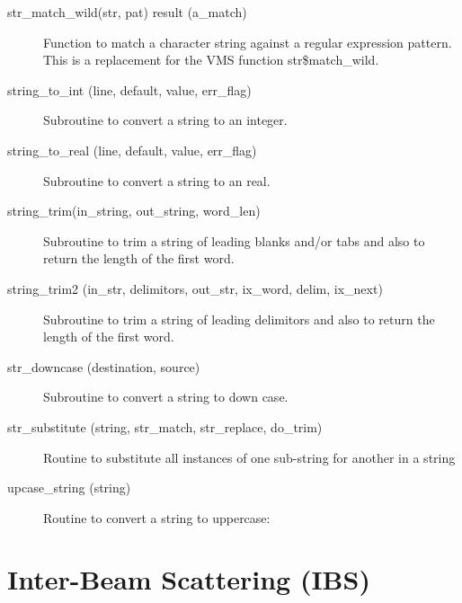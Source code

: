 \begin{description}
\label{r:str.match.wild}
\item[str_match_wild(str, pat) result (a_match)] \Newline 
Function to match a character string against a regular expression pattern.
This is a replacement for the VMS function str\$match_wild.

\label{r:string.to.int}
\item[string_to_int (line, default, value, err_flag)] \Newline 
Subroutine to convert a string to an integer.


\label{r:string.to.real}
\item[string_to_real (line, default, value, err_flag)] \Newline 
Subroutine to convert a string to an real.

\label{r:string.trim}
\item[string_trim(in_string, out_string, word_len)] \Newline 
Subroutine to trim a string of leading blanks and/or tabs and also to return the
length of the first word.

\label{r:string.trim2}
\item[string_trim2 (in_str, delimitors, out_str, ix_word, delim, ix_next)] \Newline 
Subroutine to trim a string of leading delimitors and also to return the
length of the first word.

\label{r:str.downcase}
\item[str_downcase (destination, source)] \Newline 
Subroutine to convert a string to down case.

\label{r:str.substitute}
\item[str_substitute (string, str_match, str_replace, do_trim)] \Newline 
Routine to substitute all instances of one sub-string for another in a string

\label{r:upcase.string}
\item[upcase_string (string)] \Newline 
Routine to convert a string to uppercase:

\end{description}

\section{Inter-Beam Scattering (IBS)}
\label{r:ibs}

